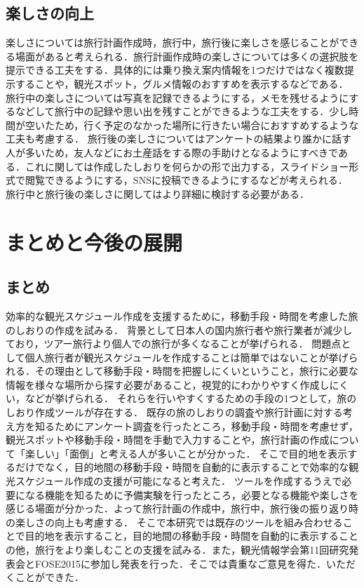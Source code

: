 \documentclass{funthesis}
\begin{document}
\section{楽しさの向上}
楽しさについては旅行計画作成時，旅行中，旅行後に楽しさを感じることができる場面があると考えられる．旅行計画作成時の楽しさについては多くの選択肢を提示できる工夫をする．具体的には乗り換え案内情報を1つだけではなく複数提示することや，観光スポット，グルメ情報のおすすめを表示するなどである．
旅行中の楽しさについては写真を記録できるようにする，メモを残せるようにするなどして旅行中の記録や思い出を残すことができるような工夫をする．少し時間が空いたため，行く予定のなかった場所に行きたい場合におすすめするような工夫も考慮する．
旅行後の楽しさについてはアンケートの結果より誰かに話す人が多いため，友人などにお土産話をする際の手助けとなるようにすべきである．これに関しては作成したしおりを何らかの形で出力する，スライドショー形式で閲覧できるようにする，SNSに投稿できるようにするなどが考えられる．
旅行中と旅行後の楽しさに関してはより詳細に検討する必要がある．


\chapter{まとめと今後の展開}%

\section{まとめ}

効率的な観光スケジュール作成を支援するために，移動手段・時間を考慮した旅のしおりの作成を試みる．
背景として日本人の国内旅行者や旅行業者が減少しており，ツアー旅行より個人での旅行が多くなることが挙げられる．
問題点として個人旅行者が観光スケジュールを作成することは簡単ではないことが挙げられる．その理由として移動手段・時間を把握しにくいということ，旅行に必要な情報を様々な場所から探す必要があること，視覚的にわかりやすく作成しにくい，などが挙げられる．
それらを行いやすくするための手段の1つとして，旅のしおり作成ツールが存在する．
既存の旅のしおりの調査や旅行計画に対する考え方を知るためにアンケート調査を行ったところ，移動手段・時間を考慮せず，観光スポットや移動手段・時間を手動で入力することや，旅行計画の作成について「楽しい」「面倒」と考える人が多いことが分かった．
そこで目的地を表示するだけでなく，目的地間の移動手段・時間を自動的に表示することで効率的な観光スケジュール作成の支援が可能になると考えた．
ツールを作成するうえで必要になる機能を知るために予備実験を行ったところ，必要となる機能や楽しさを感じる場面が分かった．よって旅行計画の作成中，旅行中，旅行後の振り返り時の楽しさの向上も考慮する．
そこで本研究では既存のツールを組み合わせることで目的地を表示すること，目的地間の移動手段・時間を自動的に表示することの他，旅行をより楽しむことの支援を試みる．また，観光情報学会第11回研究発表会とFOSE2015に参加し発表を行った．そこでは貴重なご意見を得た．いただくことができた．
\end{document}
